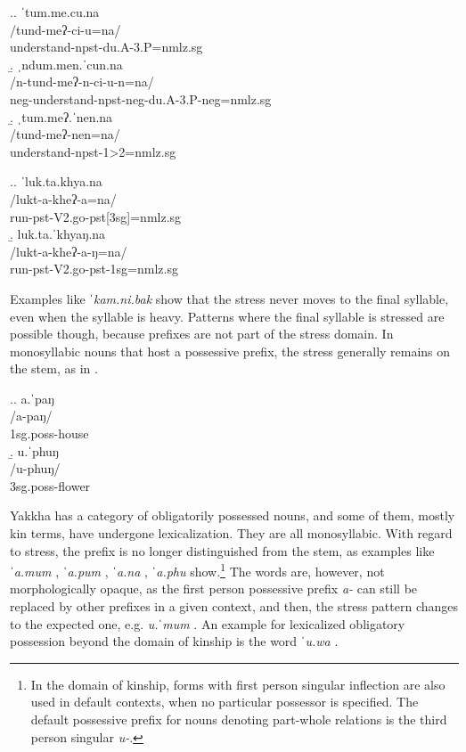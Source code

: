 \ex.\a. \glll ˈtum.me.cu.na\\
/tund-meʔ-ci-u=na/\\
understand{\sc -npst-du.A-3.P=nmlz.sg}\\
\b. \glll ˌndum.men.ˈcun.na\\
/n-tund-meʔ-n-ci-u-n=na/\label{str-ex1}\\
{\sc neg-}understand{\sc -npst-neg-du.A-3.P-neg=nmlz.sg}\\
\b. \glll ˌtum.meʔ.ˈnen.na\label{str-ex2}\\
/tund-meʔ-nen=na/\\
understand{\sc -npst-1>2=nmlz.sg}\\

\ex.\a. \glll ˈluk.ta.khya.na\\
/lukt-a-kheʔ-a=na/\\
run{\sc -pst-V2.go-pst[3sg]=nmlz.sg}\\
\b. \glll luk.ta.ˈkhyaŋ.na\\
/lukt-a-kheʔ-a-ŋ=na/\\
run{\sc -pst-V2.go-pst-1sg=nmlz.sg}\\


Examples like \emph{ˈkam.ni.bak}  show that the stress never moves to the final syllable, even when the syllable is heavy. Patterns where the final syllable is stressed are possible though, because prefixes are not part of the stress domain. In monosyllabic nouns that host a possessive prefix, the stress generally remains on the stem, as in  \Next.


\ex.\a. \glll a.ˈpaŋ\\
/a-paŋ/\\
{\sc 1sg.poss-}house\\
\b. \glll u.ˈphuŋ\\
/u-phuŋ/\\
{\sc 3sg.poss-}flower\\


Yakkha has a category of obligatorily possessed nouns, and some of them, mostly kin terms, have undergone  lexicalization. They are all monosyllabic. With regard to  stress, the prefix is no longer distinguished from the stem, as examples like \emph{ˈa.mum} , \emph{ˈa.pum} , \emph{ˈa.na} , \emph{ˈa.phu}  show.\footnote{In the domain of kinship, forms with first person singular inflection are also used in default contexts, when no particular possessor is specified. The default possessive prefix for nouns denoting part-whole relations is the third person singular \emph{u-}.} The words are, however, not morphologically opaque, as the first person possessive prefix \emph{a-} can still be replaced by other prefixes in a given context, and then, the stress pattern changes to the expected one, e.g. \emph{u.ˈmum} . An example for lexicalized obligatory possession beyond the domain of kinship is the word \emph{ˈu.wa} .

